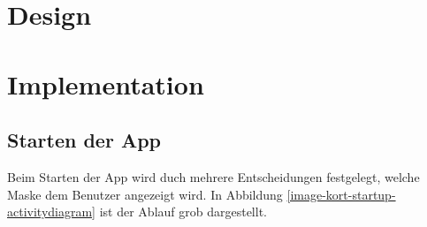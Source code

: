 \begin{figure}[H]
\hfill
{}
\end{figure}

\section{Design}

\section{Implementation}

\subsection{Starten der App}
Beim Starten der App wird duch mehrere Entscheidungen festgelegt, welche Maske dem Benutzer angezeigt wird. In Abbildung \ref{image-kort-startup-activitydiagram} ist der Ablauf grob dargestellt.

